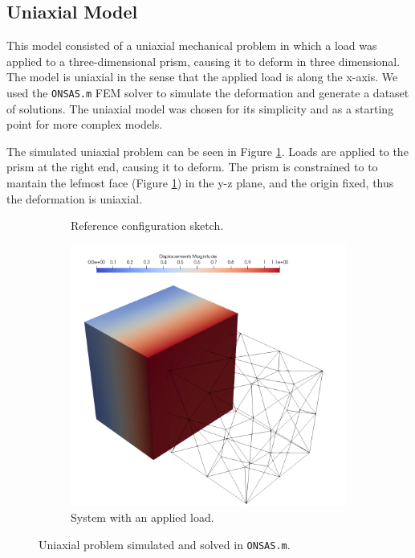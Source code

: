 \documentclass[11pt]{scrartcl} %
\begin{document}
\subsection{Uniaxial Model}
This model consisted of a uniaxial mechanical problem in which a load was applied to a three-dimensional prism, causing it to deform in three dimensional. The model is uniaxial in the sense that the applied load is along the x-axis. We used the \texttt{ONSAS.m} FEM solver to simulate the deformation and generate a dataset of solutions. The uniaxial model was chosen for its simplicity and as a starting point for more complex models.

The simulated uniaxial problem can be seen in Figure \ref{fig:uniaxial_model}. Loads are applied to the prism at the right end, causing it to deform. The prism is constrained to to mantain the lefmost face (Figure \ref{fig:uniaxial_model}) in the y-z plane, and the origin fixed, thus the deformation is uniaxial.

\begin{figure}[h]
	\centering
	\begin{subfigure}[b]{0.48\textwidth}
	\def\svgwidth{\textwidth}
	
	\caption{Reference configuration sketch.}
	\end{subfigure}
	\hfill
	\begin{subfigure}[b]{0.48\textwidth}
	\centering
		\includegraphics[width=\textwidth]{Figures/Example1.png}
	\caption{System with an applied load.}
	\end{subfigure}
	\caption{Uniaxial problem simulated and solved in \texttt{ONSAS.m}.}
	\label{fig:uniaxial_model}
\end{figure}
\end{document}
